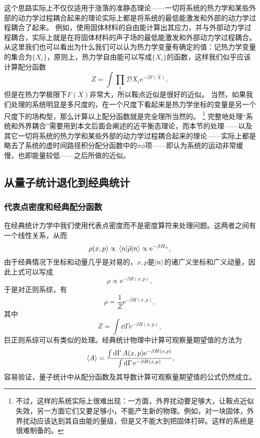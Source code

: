 \documentclass[hyperref, UTF8, a4paper]{ctexart}
\newcommand*{\ee}{\mathrm{e}}
\newcommand*{\fd}[1]{\mathcal{D}{#1}}
\begin{document}
这个思路实际上不仅仅适用于涨落的准静态理论——一切将系统的热力学和某些外部的动力学过程耦合起来的理论实际上都是将系统的最低能激发和外部的动力学过程耦合了起来。
例如，使用固体材料的自由能计算出其应力，并与外部动力学过程耦合，实际上就是在将固体材料的声子场的最低能激发和外部动力学过程耦合。
从这里我们也可以看出为什么我们可以认为热力学变量有确定的值：记热力学变量的集合为$\{X_i\}$，原则上，热力学自由能可以写成$\{X_i\}$的函数，这样我们似乎应该计算配分函数
\[
    Z = \int \prod_i \fd{X_i} \ee^{-\beta F(X)},
\]
但是在热力学极限下$F(X)$非常大，所以鞍点近似是很好的近似。
当然，如果我们处理的系统明显是多尺度的，在一个尺度下看起来是热力学坐标的变量是另一个尺度下的场构型，那么计算以上配分函数就是完全理所当然的。%
\footnote{不过，这样的系统实际上很难出现：一方面，外界扰动要足够大，让鞍点近似失效，另一方面它们又要足够小，不能产生新的物理。例如，对一块固体，外界扰动应该达到其自由能的量级，但是又不能大到把固体打碎。这样的系统是很难制备的。}%
完整地处理“系统和外界耦合”需要用到本文后面会阐述的近平衡态理论，而本节的处理——以及其它一切将系统的热力学和某些外部的动力学过程耦合起来的理论——实际上都是略去了系统的虚时间路径积分配分函数中的$\pi \dot{\phi}$项——即认为系统的运动非常缓慢，也即能量较低——之后所做的近似。

\subsection{从量子统计退化到经典统计}\label{sec:from-quantum-to-classical}

\subsubsection{代表点密度和经典配分函数}

在经典统计力学中我们使用代表点密度而不是密度算符来处理问题。这两者之间有一个线性关系，从而
\[
    \rho(x, p) \propto \mel{n}{\hat{\rho}}{n} \propto \ee^{- \beta H_n},
\]
由于经典情况下坐标和动量几乎是对易的，$x, p$是$\ket{n}$的诸广义坐标和广义动量，因此上式可以写成
\[
    \rho \propto \ee^{-\beta H(x, p)},
\]
于是对正则系综，有
\begin{equation}
    \rho = \frac{1}{Z} \ee^{- \beta H(x, p)},
\end{equation}
其中
\begin{equation}
    Z = \int \dd{\Gamma} \ee^{- \beta H(x, p)},
    \label{eq:classical-partition-function}
\end{equation}
巨正则系综可以有类似的处理。经典统计物理中计算可观察量期望值的方法为
\begin{equation}
    \expval*{A} = \frac{\int \dd{\Gamma} A(x, p) \ee^{-\beta H(x, p)}}{\int \dd{\Gamma} \ee^{-\beta H(x, p)}},
\end{equation}
容易验证，量子统计中从配分函数及其导数计算可观察量期望值的公式仍然成立。
\end{document}
